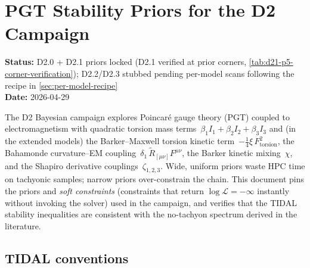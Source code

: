
\section{PGT Stability Priors for the D2 Campaign}
\label{sec:pgt-stability-priors}

\textbf{Status:} D2.0 + D2.1 priors locked (D2.1 verified at prior corners,
\cref{tab:d21-p5-corner-verification}); D2.2/D2.3 stubbed pending per-model
scans following the recipe in \cref{sec:per-model-recipe} \\
\textbf{Date:} 2026-04-29

The D2 Bayesian campaign explores Poincar\'e gauge theory (PGT) coupled to
electromagnetism with quadratic torsion mass terms~$\beta_1 I_1 + \beta_2 I_2 + \beta_3 I_3$
and (in the extended models) the Barker--Maxwell torsion kinetic
term~$-\tfrac{1}{4}\xi\, F_{\mathrm{torsion}}^2$, the Bahamonde curvature--EM
coupling~$\delta_1\, \tilde{R}_{[\mu\nu]} F^{\mu\nu}$, the Barker kinetic
mixing~$\chi$, and the Shapiro derivative couplings~$\zeta_{1,2,3}$.  Wide,
uniform priors waste HPC time on tachyonic samples; narrow priors over-constrain
the chain.  This document pins the priors and \emph{soft constraints} (constraints
that return $\log\mathcal{L}=-\infty$ instantly without invoking the solver) used
in the campaign, and verifies that the TIDAL stability inequalities are
consistent with the no-tachyon spectrum derived in the literature.

\subsection{TIDAL conventions}
\label{sec:tidal-conventions}

